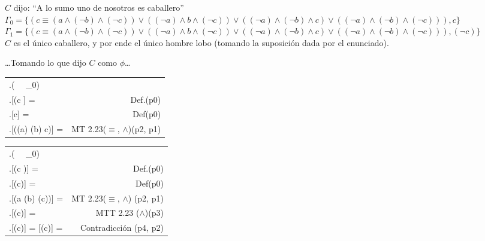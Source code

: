 \documentclass{article}
\newcommand{\q}[1]{``#1''}
\newcommand{\val}[2]{\mathbf{#1}[#2]}
\newlength{\logicv}
\newenvironment{logicenv}[2][0]{
  \begin{tcolorbox}[demo, title = #2]
  \vspace*{#1\logicv}
}{
  \end{tcolorbox}
  \vspace*{-.5cm}
}
\newenvironment{subproofill}[1][0]{
  \begin{tcolorbox}[demo, title = ]
    \vspace*{-#1\logicv}
}{
  \end{tcolorbox}
  \vspace*{-.5cm}
}
\newenvironment{subproof}[2][0]{
  \begin{tcolorbox}[demo, title = #2, colframe = black]
  \vspace*{#1\logicv}
  \begin{logic}
}{
  \end{logic}
  \end{tcolorbox}
}
\newenvironment{logic}{
    \setlength{\extrarowheight}{3pt}
    \setcounter{row}{-1}
    \begin{center}
    \begin{NiceTabular}{>{\stepcounter{row}\therow.\hspace*{5pt}} L r }
}{
    \end{NiceTabular}
    \end{center}
}
\begin{document}
\begin{logicenv}[5]{Punto 23}
  $C$ dijo: \q{A lo sumo uno de nosotros es caballero}\\
  $\Gamma_0 = \{(c \equiv (a \land (\neg b) \land (\neg c)) \lor ((\neg a) \land b \land (\neg c)) \lor ((\neg a) \land (\neg b) \land c) \lor ((\neg a) \land (\neg b) \land (\neg c))), c\}$\\
  $\Gamma_1 = \{(c \equiv (a \land (\neg b) \land (\neg c)) \lor ((\neg a) \land b \land (\neg c)) \lor ((\neg a) \land (\neg b) \land c) \lor ((\neg a) \land (\neg b) \land (\neg c))), (\neg c)\}$
  \makebox[16.5cm]{\hrulefill}\\
  $C$ es el único caballero, y por ende el único hombre lobo (tomando la suposición dada por el enunciado).
\end{logicenv}
\begin{subproofill}
  \dots Tomando lo que dijo $C$ como $\phi$\dots
  \begin{subproof}[5]{Con $\Gamma_0$}
    (\exists {} \, \vert\,   \Gamma_0)\\
    \val{v}{(c \equiv \phi} =  & Def.(p0)\\
    \val{v}{c} =  & Def(p0)\\
    \val{v}{((\neg a) \land (\neg b) \land c)} =  & MT 2.23($\equiv$, $\land$)(p2, p1)\\
  \end{subproof}
\end{subproofill}
\begin{subproofill}
  \begin{subproof}[5]{Con $\Gamma_1$}
    (\exists {} \, \vert\,   \Gamma_0)\\
    \val{v}{(c \equiv \phi)} =  & Def.(p0)\\
    \val{v}{(\neg c)} =  & Def(p0)\\
    \val{v}{(a \land (\neg b) \land (\neg c))} =  & MT 2.23($\equiv$, $\land$) (p2, p1)\\
    \val{v}{(\neg c)} =  & MTT 2.23 ($\land$)(p3)\\ 
    \val{v}{(\neg c)} =   \val{v}{(\neg c)} =  & Contradicción (p4, p2)
  \end{subproof} 
\end{subproofill}
\end{document}
